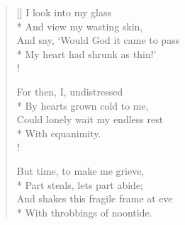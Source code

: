 \documentclass[MAIN]{subfiles}
\begin{document}
\settowidth{\versewidth}{And say, `Would God it came to pass}
\begin{verse}[\versewidth]
I look into my glass\\*
\vin And view my wasting skin,\\
And say, `Would God it came to pass\\*
\vin My heart had shrunk as thin!'\\!

For then, I, undistressed\\*
\vin By hearts grown cold to me,\\
Could lonely wait my endless rest\\*
\vin With equanimity.\\!

But time, to make me grieve,\\*
\vin Part steals, lets part abide;\\
And shakes this fragile frame at eve\\*
\vin With throbbings of noontide.
\end{verse}
\end{document}
